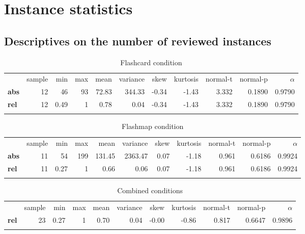 \chapter{Instance statistics}
\label{app:instance_stats}

\FloatBarrier
\section{Descriptives on the number of reviewed instances}

\begin{longtable}[c]{@{}lrrrrrrrrrr@{}}
    \caption{Flashcard condition}
    \endfirsthead
    \endhead
\toprule\addlinespace
& sample & min & max & mean & variance & skew & kurtosis & normal-t &
normal-p & $\alpha$
\\\addlinespace
\midrule
\textbf{abs} & 12 & 46 & 93 & 72.83 & 344.33 & -0.34 & -1.43 & 3.332 &
0.1890 & 0.9790
\\\addlinespace
\textbf{rel} & 12 & 0.49 & 1 & 0.78 & 0.04 & -0.34 & -1.43 & 3.332 & 0.1890
& 0.9790
\\\addlinespace
\bottomrule
    \label{tab:instance_fc}
\end{longtable}

\begin{longtable}[c]{@{}lrrrrrrrrrr@{}}
    \caption{Flashmap condition}
    \endfirsthead
    \endhead
\toprule\addlinespace
& sample & min & max & mean & variance & skew & kurtosis & normal-t &
normal-p & $\alpha$
\\\addlinespace
\midrule
\textbf{abs} & 11 & 54 & 199 & 131.45 & 2363.47 & 0.07 & -1.18 & 0.961 &
0.6186 & 0.9924
\\\addlinespace
\textbf{rel} & 11 & 0.27 & 1 & 0.66 & 0.06 & 0.07 & -1.18 & 0.961 & 0.6186
& 0.9924
\\\addlinespace
\bottomrule
    \label{tab:instance_fm}
\end{longtable}

\begin{longtable}[c]{@{}lrrrrrrrrrr@{}}
    \caption{Combined conditions}
    \endfirsthead
    \endhead
\toprule\addlinespace
& sample & min & max & mean & variance & skew & kurtosis & normal-t &
normal-p & $\alpha$
\\\addlinespace
\midrule
\textbf{rel} & 23 & 0.27 & 1 & 0.70 & 0.04 & -0.00 & -0.86 & 0.817 & 0.6647
& 0.9896
\\\addlinespace
\bottomrule
    \label{tab:instance_gen}
\end{longtable}

